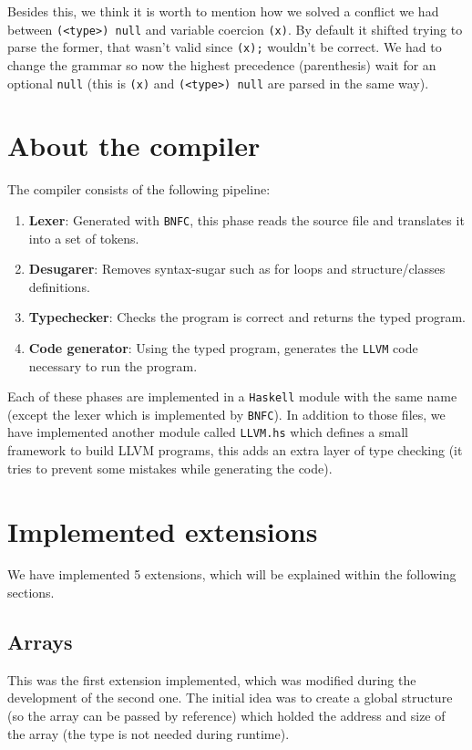 \documentclass{article}
\begin{document}
Besides this, we think it is worth to mention how we solved a conflict we had between \texttt{(<type>) null} and variable coercion \texttt{(x)}. By default it shifted trying to parse the former, that wasn't valid since \texttt{(x);} wouldn't be correct. We had to change the grammar so now the highest precedence (parenthesis) wait for an optional \texttt{null} (this is \texttt{(x)} and \texttt{(<type>) null} are parsed in the same way).
\section{About the compiler}

The compiler consists of the following pipeline:

\begin{enumerate}
 \item {\bf Lexer}: Generated with \texttt{BNFC}, this phase reads the source file and translates it into a set of tokens.
 \item {\bf Desugarer}: Removes syntax-sugar such as for loops and structure/classes definitions.
 \item {\bf Typechecker}: Checks the program is correct and returns the typed program.
 \item {\bf Code generator}: Using the typed program, generates the \texttt{LLVM} code necessary to run the program.
\end{enumerate}

Each of these phases are implemented in a \texttt{Haskell} module with the same name (except the lexer which is implemented by \texttt{BNFC}). In addition to those files, we have implemented another module called \texttt{LLVM.hs} which defines a small framework to build LLVM programs, this adds an extra layer of type checking (it tries to prevent some mistakes while generating the code).

\section{Implemented extensions}

We have implemented 5 extensions, which will be explained within the following sections.

\subsection{Arrays}

This was the first extension implemented, which was modified during the development of the second one. The initial idea was to create a global structure (so the array can be passed by reference) which holded the address and size of the array (the type is not needed during runtime).
\end{document}
